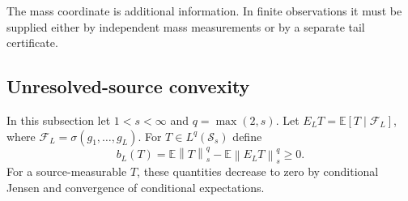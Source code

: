 \documentclass[11pt,a4paper]{amsart}
\numberwithin{equation}{section}
\theoremstyle{definition}
\theoremstyle{remark}
\newcommand{\E}{\mathbb E}
\newcommand{\Sch}{\mathcal S}
\newcommand{\norm}[1]{\left\lVert#1\right\rVert}
\begin{document}
The mass coordinate is additional information. In finite observations it must be supplied either by independent mass measurements or by a separate tail certificate.

\subsection{Unresolved-source convexity}
In this subsection let $1<s<\infty$ and $q=\max(2,s)$. Let $E_LT=\E[T\mid\mathcal F_L]$, where $\mathcal F_L=\sigma(g_1,\ldots,g_L)$. For $T\in L^q(\Sch_s)$ define
\begin{equation}\label{eq:sourcegap}
 b_L(T)=\E\norm T_s^q-\E\norm{E_LT}_s^q\ge0.
\end{equation}
For a source-measurable $T$, these quantities decrease to zero by conditional Jensen and convergence of conditional expectations.
\end{document}

